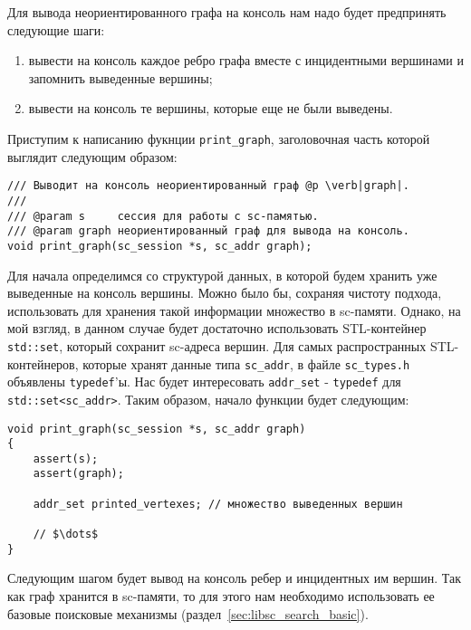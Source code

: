 Для вывода неориентированного графа на консоль нам надо будет
предпринять следующие шаги:
\begin{enumerate}
\item вывести на консоль каждое ребро графа вместе с инцидентными
  вершинами и запомнить выведенные вершины;
\item вывести на консоль те вершины, которые еще не были выведены.
\end{enumerate}

Приступим к написанию фукнции \lstinline|print_graph|, заголовочная
часть которой выглядит следующим образом:
\begin{lstlisting}[texcl]
/// Выводит на консоль неориентированный граф @p \verb|graph|.
///
/// @param s     сессия для работы с sc-памятью.
/// @param graph неориентированный граф для вывода на консоль.
void print_graph(sc_session *s, sc_addr graph);
\end{lstlisting}

Для начала определимся со структурой данных, в которой будем хранить
уже выведенные на консоль вершины. Можно было бы, сохраняя чистоту
подхода, использовать для хранения такой информации множество в
sc-памяти. Однако, на мой взгляд, в данном случае будет достаточно
использовать STL-контейнер \lstinline|std::set|, который сохранит
sc-адреса вершин. Для самых распространных STL-контейнеров, которые
хранят данные типа \lstinline|sc_addr|, в файле \verb|sc_types.h|
объявлены \lstinline|typedef|'ы. Нас будет интересовать
\lstinline|addr_set| - \lstinline|typedef| для
\lstinline|std::set<sc_addr>|. Таким образом, начало функции будет
следующим:
\begin{lstlisting}[texcl]
void print_graph(sc_session *s, sc_addr graph)
{
    assert(s);
    assert(graph);

    addr_set printed_vertexes; // множество выведенных вершин

    // $\dots$
}
\end{lstlisting}

Следующим шагом будет вывод на консоль ребер и инцидентных им
вершин. Так как граф хранится в sc-памяти, то для этого нам необходимо
использовать ее базовые поисковые механизмы
(раздел~\ref{sec:libsc_search_basic}).

